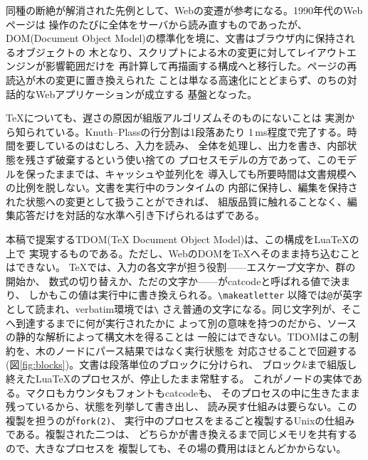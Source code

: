 \documentclass[a4paper,11pt]{ltjsarticle}
\newcommand{\tdom}{TDOM}
\newcommand{\code}[1]{\texttt{#1}}
\begin{document}
同種の断絶が解消された先例として、Webの変遷が参考になる。1990年代のWebページは
操作のたびに全体をサーバから読み直すものであったが、DOM(Document Object
Model)\cite{w3cdom}の標準化を境に、文書はブラウザ内に保持されるオブジェクトの
木となり、スクリプトによる木の変更に対してレイアウトエンジンが影響範囲だけを
再計算して再描画する構成へと移行した。ページの再読込が木の変更に置き換えられた
ことは単なる高速化にとどまらず、のちの対話的なWebアプリケーションが成立する
基盤となった。

\TeX{}についても、遅さの原因が組版アルゴリズムそのものにないことは
実測から知られている。Knuth--Plassの行分割\cite{knuthplass}は1段落あたり
1\,ms程度で完了する\cite{lode2026}。時間を要しているのはむしろ、入力を読み、
全体を処理し、出力を書き、内部状態を残さず破棄するという使い捨ての
プロセスモデルの方であって、このモデルを保ったままでは、キャッシュや並列化を
導入しても所要時間は文書規模への比例を脱しない。文書を実行中のランタイムの
内部に保持し、編集を保持された状態への変更として扱うことができれば、
組版品質に触れることなく、編集応答だけを対話的な水準へ引き下げられるはずである。

本稿で提案する\tdom{}(TeX Document Object Model)は、この構成をLuaTeXの上で
実現するものである。ただし、WebのDOMを\TeX{}へそのまま持ち込むことはできない。
\TeX{}では、入力の各文字が担う役割——エスケープ文字か、群の開始か、
数式の切り替えか、ただの文字か——がcatcodeと呼ばれる値で決まり、
しかもこの値は実行中に書き換えられる。\code{\textbackslash makeatletter}
以降では\code{@}が英字として読まれ、verbatim環境では\code{\textbackslash}
さえ普通の文字になる。同じ文字列が、そこへ到達するまでに何が実行されたかに
よって別の意味を持つのだから、ソースの静的な解析によって構文木を得ることは
一般にはできない\cite{texbook}。\tdom{}はこの制約を、木のノードにパース結果ではなく実行状態を
対応させることで回避する(図\ref{fig:blocks})。文書は段落単位のブロックに分けられ、
ブロック$k$まで組版し終えたLuaTeXのプロセスが、停止したまま常駐する。
これがノードの実体である。マクロもカウンタもフォントもcatcodeも、
そのプロセスの中に生きたまま残っているから、状態を列挙して書き出し、
読み戻す仕組みは要らない。この複製を担うのが\code{fork(2)}、
実行中のプロセスをまるごと複製するUnixの仕組みである。複製された二つは、
どちらかが書き換えるまで同じメモリを共有するので、大きなプロセスを
複製しても、その場の費用はほとんどかからない。
\end{document}
